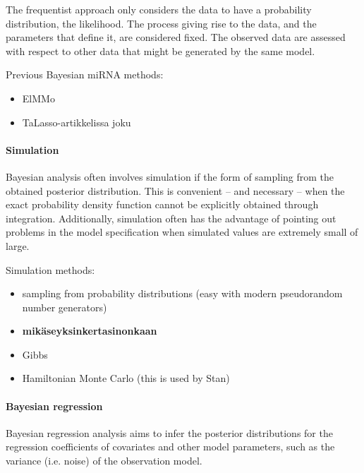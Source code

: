 The frequentist approach only considers the data to have a probability
distribution, the likelihood. The process giving rise to the data, and the
parameters that define it, are considered fixed. The observed data are
assessed with respect to other data that might be generated by the same model.






Previous Bayesian miRNA methods:
\begin{itemize}
  \item
  ElMMo
  \item
  TaLasso-artikkelissa joku
\end{itemize}




\paragraph{Simulation}\label{simulation}

Bayesian analysis often involves simulation if the form of sampling from the
obtained posterior distribution. This is convenient -- and necessary -- when
the exact probability density function cannot be explicitly obtained through
integration. Additionally, simulation often has the advantage of pointing out
problems in the model specification when simulated values are extremely small
of large.

Simulation methods:
\begin{itemize}
  \item
  sampling from probability distributions (easy with modern pseudorandom
  number generators)
  \item
  \textbf{mikäseyksinkertasinonkaan}
  \item
  Gibbs
  \item
  Hamiltonian Monte Carlo (this is used by Stan)
\end{itemize}


\paragraph{Bayesian regression}\label{bayesian-regression}

Bayesian regression analysis aims to infer the posterior distributions
for the regression coefficients of covariates and other model parameters,
such as the variance (i.e. noise) of the observation model.
